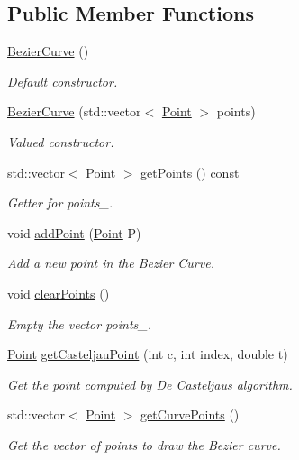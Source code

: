 \subsection*{Public Member Functions}
\begin{DoxyCompactItemize}
\item 
\mbox{\hyperlink{class_bezier_curve_af30b8df568e50499b596aff578198425}{Bezier\+Curve}} ()
\begin{DoxyCompactList}\small\item\em Default constructor. \end{DoxyCompactList}\item 
\mbox{\hyperlink{class_bezier_curve_abf9565fc1a6be43b0f1503e2db52ffd1}{Bezier\+Curve}} (std\+::vector$<$ \mbox{\hyperlink{class_point}{Point}} $>$ points)
\begin{DoxyCompactList}\small\item\em Valued constructor. \end{DoxyCompactList}\item 
std\+::vector$<$ \mbox{\hyperlink{class_point}{Point}} $>$ \mbox{\hyperlink{class_bezier_curve_a0ebb942d8285628bead89d154f39e616}{get\+Points}} () const
\begin{DoxyCompactList}\small\item\em Getter for points\+\_\+. \end{DoxyCompactList}\item 
void \mbox{\hyperlink{class_bezier_curve_a38d16c18b36ae45619b05e26e226cf34}{add\+Point}} (\mbox{\hyperlink{class_point}{Point}} P)
\begin{DoxyCompactList}\small\item\em Add a new point in the Bezier Curve. \end{DoxyCompactList}\item 
void \mbox{\hyperlink{class_bezier_curve_a0ba8ce66d5af5971ae6a1b506029728e}{clear\+Points}} ()
\begin{DoxyCompactList}\small\item\em Empty the vector points\+\_\+. \end{DoxyCompactList}\item 
\mbox{\hyperlink{class_point}{Point}} \mbox{\hyperlink{class_bezier_curve_a7e0c40cb373da6aa1aa1acd5fce9d503}{get\+Casteljau\+Point}} (int c, int index, double t)
\begin{DoxyCompactList}\small\item\em Get the point computed by De Casteljau\textquotesingle{}s algorithm. \end{DoxyCompactList}\item 
std\+::vector$<$ \mbox{\hyperlink{class_point}{Point}} $>$ \mbox{\hyperlink{class_bezier_curve_a2b4482d322a84df3fa22f4e491cb2bc3}{get\+Curve\+Points}} ()
\begin{DoxyCompactList}\small\item\em Get the vector of points to draw the Bezier curve. \end{DoxyCompactList}\end{DoxyCompactItemize}
